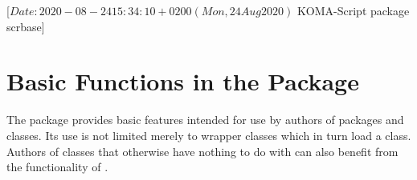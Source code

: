 %
%
%
%
%
%
%
%
% 
%
%
%
%

                 [$Date: 2020-08-24 15:34:10 +0200 (Mon, 24 Aug 2020) $
                  KOMA-Script package scrbase]


\chapter{Basic Functions in the  Package}
\BeginIndexGroup
{}%

The  package provides basic features intended for use by
authors of packages and classes. Its use is not limited merely to wrapper
classes which in turn load a \KOMAScript{} class. Authors of classes that
otherwise have nothing to do with \KOMAScript{} can also benefit from the
functionality of .

